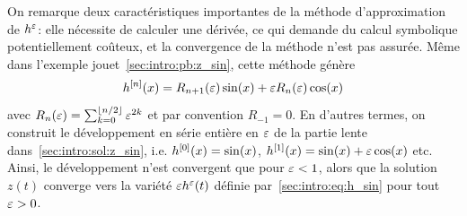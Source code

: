 On remarque deux caractéristiques importantes de la méthode d'approximation de $h^{\varepsilon}$: elle nécessite de calculer une dérivée, ce qui demande du calcul symbolique potentiellement coûteux, et la convergence de la méthode n'est pas assurée. Même dans l'exemple jouet~\eqref{sec:intro:pb:z_sin}, cette méthode génère
\begin{equation*}
    h^{[n]}(x) = R_{n+1}(\varepsilon) \sin(x) + \varepsilon R_{n}(\varepsilon) \cos(x) 
\end{equation*}
avec $R_n(\varepsilon) = \sum_{k = 0}^{\left\lfloor n/2 \right\rfloor} \varepsilon^{2k}$ et par convention $R_{-1} = 0$. En d'autres termes, on construit le développement en série entière en $\varepsilon$ de la partie lente dans~\eqref{sec:intro:sol:z_sin}, i.e. $h^{[0]}(x) = \sin(x)$, $h^{[1]} (x) = \sin(x) + \varepsilon \cos(x)$ etc. Ainsi, le développement n'est convergent que pour $\varepsilon < 1$, alors que la solution $z(t)$ converge vers la variété $\varepsilon h^{\varepsilon}(t)$ définie par~\eqref{sec:intro:eq:h_sin} pour tout $\varepsilon > 0$. 


